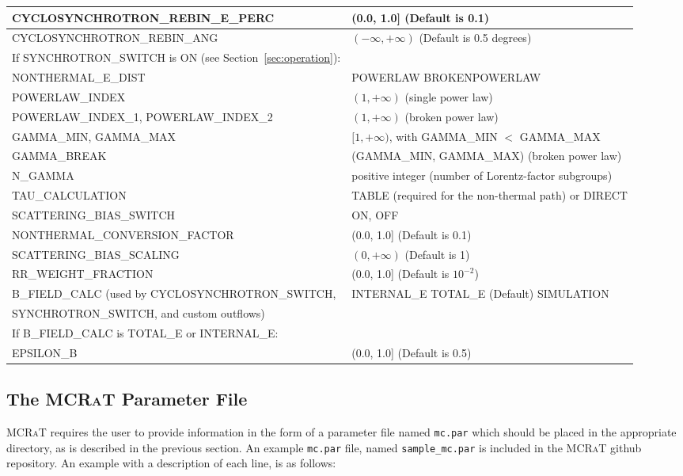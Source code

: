 \documentclass[12pt,a4paper]{article}
\newcommand{\mcrat}{\textsc{MCRaT}}
\begin{document}
\begin{longtable}{|p{}|p{}|}
\hline
CYCLOSYNCHROTRON\_REBIN\_E\_PERC & (0.0, 1.0] (Default is 0.1)\\
\hline
CYCLOSYNCHROTRON\_REBIN\_ANG & $(-\infty, +\infty)$ (Default is 0.5 degrees) \\
\hline
\hline
If SYNCHROTRON\_SWITCH is ON (see Section~\ref{sec:operation}): & \\
\hline
NONTHERMAL\_E\_DIST & POWERLAW \newline BROKENPOWERLAW \\
\hline
POWERLAW\_INDEX & $(1, +\infty)$ (single power law) \\
\hline
POWERLAW\_INDEX\_1, POWERLAW\_INDEX\_2 & $(1, +\infty)$ (broken power law) \\
\hline
GAMMA\_MIN, GAMMA\_MAX & $[1, +\infty)$, with GAMMA\_MIN $<$ GAMMA\_MAX \\
\hline
GAMMA\_BREAK & (GAMMA\_MIN, GAMMA\_MAX) (broken power law) \\
\hline
N\_GAMMA & positive integer (number of Lorentz-factor subgroups) \\
\hline
TAU\_CALCULATION & TABLE (required for the non-thermal path) or DIRECT \\
\hline
SCATTERING\_BIAS\_SWITCH & ON, OFF \\
\hline
NONTHERMAL\_CONVERSION\_FACTOR & (0.0, 1.0] (Default is 0.1) \\
\hline
SCATTERING\_BIAS\_SCALING & $(0, +\infty)$ (Default is 1) \\
\hline
RR\_WEIGHT\_FRACTION & (0.0, 1.0] (Default is $10^{-2}$) \\
\hline
\hline
B\_FIELD\_CALC (used by CYCLOSYNCHROTRON\_SWITCH, & INTERNAL\_E \newline TOTAL\_E (Default) \newline SIMULATION\\
SYNCHROTRON\_SWITCH, and custom outflows) & \\
\hline
\hline
If B\_FIELD\_CALC is TOTAL\_E or INTERNAL\_E: & \\
\hline
EPSILON\_B & (0.0, 1.0] (Default is 0.5)\\
\hline
\end{longtable} 





\subsection{The \mcrat{} Parameter File} \label{mc.par}
\mcrat{} requires the user to provide information in the form of a parameter file named \texttt{mc.par} which should be placed in the appropriate directory, as is described in the previous section. An example \texttt{mc.par} file, named \texttt{sample\_mc.par} is included in the \mcrat{} github repository. An example with a description of each line, is as follows:
\end{document}
